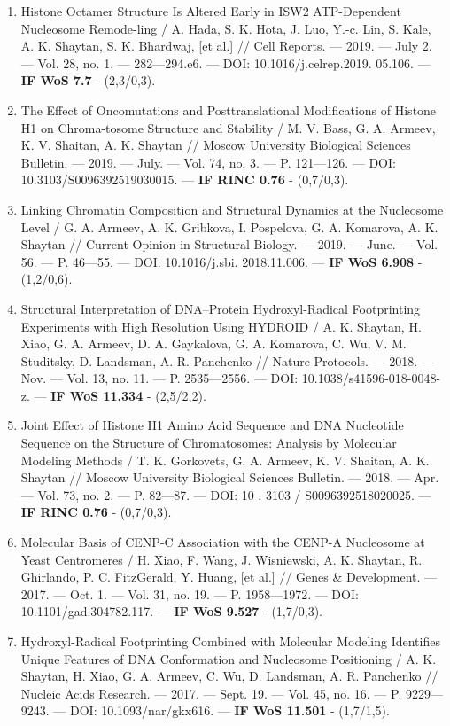 \begin{frame}[allowframebreaks]
\begin{enumerate}
 \item Histone Octamer Structure Is Altered Early in ISW2 ATP-Dependent Nucleosome Remode-ling / A. Hada, S. K. Hota, J. Luo, Y.-c. Lin, S. Kale, A. K. Shaytan, S. K. Bhardwaj, [et al.] // Cell Reports. –– 2019. –– July 2. –– Vol. 28, no. 1. –– 282––294.e6. –– DOI: 10.1016/j.celrep.2019. 05.106. –– \textbf{IF WoS 7.7} - (2,3/0,3).
\item The Effect of Oncomutations and Posttranslational Modifications of Histone H1 on Chroma-tosome Structure and Stability / M. V. Bass, G. A. Armeev, K. V. Shaitan, A. K. Shaytan // Moscow University Biological Sciences Bulletin. –– 2019. –– July. –– Vol. 74, no. 3. –– P. 121––126. –– DOI: 10.3103/S0096392519030015. –– \textbf{IF RINC 0.76} - (0,7/0,3).
\item  Linking Chromatin Composition and Structural Dynamics at the Nucleosome Level / G. A. Armeev, A. K. Gribkova, I. Pospelova, G. A. Komarova, A. K. Shaytan // Current Opinion in Structural Biology. –– 2019. –– June. –– Vol. 56. –– P. 46––55. –– DOI: 10.1016/j.sbi. 2018.11.006. –– \textbf{IF WoS 6.908} - (1,2/0,6).
\item  Structural Interpretation of DNA–Protein Hydroxyl-Radical Footprinting Experiments with High Resolution Using HYDROID / A. K. Shaytan, H. Xiao, G. A. Armeev, D. A. Gaykalova, G. A. Komarova, C. Wu, V. M. Studitsky, D. Landsman, A. R. Panchenko // Nature Protocols. –– 2018. –– Nov. –– Vol. 13, no. 11. –– P. 2535––2556. –– DOI: 10.1038/s41596-018-0048-z. –– \textbf{IF WoS 11.334} - (2,5/2,2).
\item  Joint Effect of Histone H1 Amino Acid Sequence and DNA Nucleotide Sequence on the Structure of Chromatosomes: Analysis by Molecular Modeling Methods / T. K. Gorkovets, G. A. Armeev, K. V. Shaitan, A. K. Shaytan // Moscow University Biological Sciences Bulletin. –– 2018. –– Apr. –– Vol. 73, no. 2. –– P. 82––87. –– DOI: 10 . 3103 / S0096392518020025. –– \textbf{IF RINC 0.76} - (0,7/0,3).
\item  Molecular Basis of CENP-C Association with the CENP-A Nucleosome at Yeast Centromeres / H. Xiao, F. Wang, J. Wisniewski, A. K. Shaytan, R. Ghirlando, P. C. FitzGerald, Y. Huang, [et al.] // Genes \& Development. –– 2017. –– Oct. 1. –– Vol. 31, no. 19. –– P. 1958––1972. –– DOI: 10.1101/gad.304782.117. –– \textbf{IF WoS 9.527} - (1,7/0,3).
\item  Hydroxyl-Radical Footprinting Combined with Molecular Modeling Identifies Unique Features of DNA Conformation and Nucleosome Positioning / A. K. Shaytan, H. Xiao, G. A. Armeev, C. Wu, D. Landsman, A. R. Panchenko // Nucleic Acids Research. –– 2017. –– Sept. 19. –– Vol. 45, no. 16. –– P. 9229––9243. –– DOI: 10.1093/nar/gkx616. –– \textbf{IF WoS 11.501} - (1,7/1,5).

\end{enumerate}
\end{frame}
